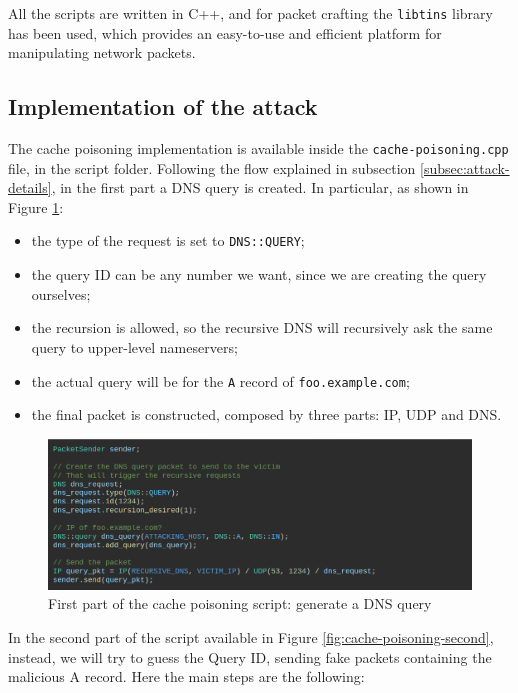 \documentclass[11pt,a4paper]{article}
\begin{document}
\noindent
All the scripts are written in C++, and for packet crafting the \texttt{libtins} library has been used, which provides an easy-to-use and efficient platform for manipulating network packets.

\subsection{Implementation of the attack}
The cache poisoning implementation is available inside the \texttt{cache-poisoning.cpp} file, in the script folder. Following the flow explained in subsection \ref{subsec:attack-details}, in the first part a DNS query is created. In particular, as shown in Figure \ref{fig:cache-poisoning-first}:
\begin{itemize}
    \item the type of the request is set to \texttt{DNS::QUERY};
    \item the query ID can be any number we want, since we are creating the query ourselves;
    \item the recursion is allowed, so the recursive DNS will recursively ask the same query to upper-level nameservers;
    \item the actual query will be for the \texttt{A} record of \texttt{foo.example.com};
    \item the final packet is constructed, composed by three parts: IP, UDP and DNS.
\end{itemize}

\begin{figure}[h]
    \centering
    \includegraphics[width=\textwidth]{cache-poisoning-first.png}
    \caption{First part of the cache poisoning script: generate a DNS query}
    \label{fig:cache-poisoning-first}
\end{figure}

\noindent
In the second part of the script available in Figure \ref{fig:cache-poisoning-second}, instead, we will try to guess the Query ID, sending fake packets containing the malicious A record. Here the main steps are the following:
\end{document}
